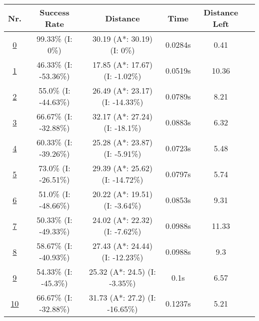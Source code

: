 \clearpage

\begin{table}[h!] 
\small 
\centering


\begin{tabular}{|cc|c|c|c|c|c|}
\hline
\multicolumn{2}{|c|}{\textbf{Nr.}} & \textbf{Success Rate} & \textbf{Distance} & \textbf{Time} & \textbf{Distance Left}\\
\hline
\hline
\multicolumn{2}{|c|}{\cellcolor{lightgray!20} \hyperref[tab: evalalgorithms]{0}} & 99.33\% (I: 0\%) & 30.19 (A*: 30.19) (I: 0\%) & 0.0284s & 0.41\\
\hline
\hline
\multicolumn{2}{|c|}{\cellcolor{red!40} \hyperref[tab: evalalgorithms]{1}} & 46.33\% (I: -53.36\%) & 17.85 (A*: 17.67) (I: -1.02\%) & 0.0519s & 10.36\\
\hline
\multicolumn{2}{|c|}{\cellcolor{red!20} \hyperref[tab: evalalgorithms]{2}} & 55.0\% (I: -44.63\%) & 26.49 (A*: 23.17) (I: -14.33\%) & 0.0789s & 8.21\\
\hline
\multicolumn{2}{|c|}{\cellcolor{red!20} \hyperref[tab: evalalgorithms]{3}} & 66.67\% (I: -32.88\%) & 32.17 (A*: 27.24) (I: -18.1\%) & 0.0883s & 6.32\\
\hline
\multicolumn{2}{|c|}{\cellcolor{red!20} \hyperref[tab: evalalgorithms]{4}} & 60.33\% (I: -39.26\%) & 25.28 (A*: 23.87) (I: -5.91\%) & 0.0723s & 5.48\\
\hline
\multicolumn{2}{|c|}{\cellcolor{red!20} \hyperref[tab: evalalgorithms]{5}} & 73.0\% (I: -26.51\%) & 29.39 (A*: 25.62) (I: -14.72\%) & 0.0797s & 5.74\\
\hline
\hline
\multicolumn{2}{|c|}{\cellcolor{blue!20} \hyperref[tab: evalalgorithms]{6}} & 51.0\% (I: -48.66\%) & 20.22 (A*: 19.51) (I: -3.64\%) & 0.0853s & 9.31\\
\hline
\multicolumn{2}{|c|}{\cellcolor{blue!40} \hyperref[tab: evalalgorithms]{7}} & 50.33\% (I: -49.33\%) & 24.02 (A*: 22.32) (I: -7.62\%) & 0.0988s & 11.33\\
\hline
\multicolumn{2}{|c|}{\cellcolor{blue!20} \hyperref[tab: evalalgorithms]{8}} & 58.67\% (I: -40.93\%) & 27.43 (A*: 24.44) (I: -12.23\%) & 0.0988s & 9.3\\
\hline
\multicolumn{2}{|c|}{\cellcolor{blue!20} \hyperref[tab: evalalgorithms]{9}} & 54.33\% (I: -45.3\%) & 25.32 (A*: 24.5) (I: -3.35\%) & 0.1s & 6.57\\
\hline
\multicolumn{2}{|c|}{\cellcolor{blue!20} \hyperref[tab: evalalgorithms]{10}} & 66.67\% (I: -32.88\%) & 31.73 (A*: 27.2) (I: -16.65\%) & 0.1237s & 5.21\\

\end{tabular}
\end{table}
